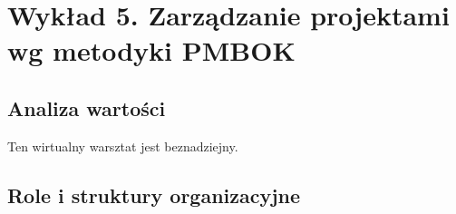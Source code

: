 \chapter{Wykład 5. Zarządzanie projektami wg metodyki PMBOK}

\section{Analiza wartości}

Ten wirtualny warsztat jest beznadziejny.


\section{Role i struktury organizacyjne}

